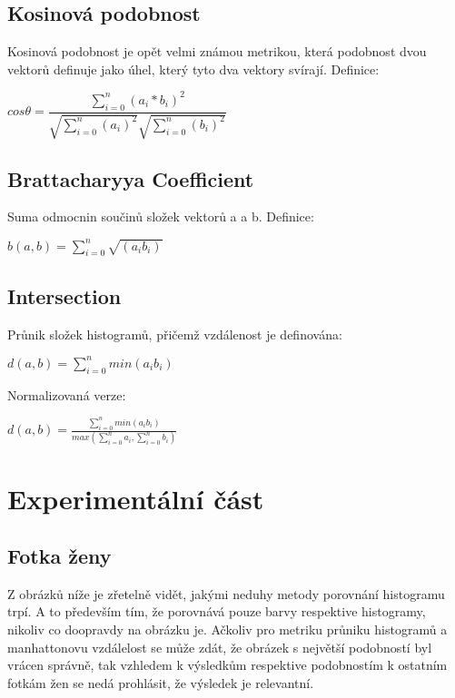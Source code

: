 \documentclass{report}
\begin{document}
	\subsection{Kosinová podobnost}
	Kosinová podobnost je opět velmi známou metrikou, která podobnost dvou vektorů definuje jako úhel, který tyto dva vektory svírají.
	Definice:
	\begin{center}
		$cos\theta = \dfrac{\sum_{i=0}^n (a_i*b_i)^2}{\sqrt{\sum_{i=0}^n (a_i)^2}\sqrt{\sum_{i=0}^n (b_i)^2}}$
	\end{center}
	\subsection{Brattacharyya Coefficient}
	Suma odmocnin součinů složek vektorů a a b.
	Definice: 

	\begin{center}
		$b(a,b) = \sum_{i=0}^{n}{\sqrt{(a_i b_i)}}$
	\end{center}

	\subsection{Intersection}
	Průnik složek histogramů, přičemž vzdálenost je definována:

	\begin{center}
		$d(a,b) = \sum_{i=0}^{n}{min(a_i b_i)}$
	\end{center}

	Normalizovaná verze:
	\begin{center}
		$d(a,b) = \frac{\sum_{i=0}^{n}{min(a_i b_i)}}{max(\sum_{i=0}^{n}{a_i},\sum_{i=0}^{n}{b_i})}$
	\end{center}


\clearpage
\section{Experimentální část}
	\subsection{Fotka ženy}
	Z obrázků níže je zřetelně vidět, jakými neduhy metody porovnání histogramu trpí. A to především tím, že porovnává pouze barvy respektive histogramy, nikoliv co doopravdy na obrázku je. Ačkoliv pro metriku průniku histogramů a manhattonovu vzdálelost se může zdát, že obrázek s největší podobností byl vrácen správně, tak vzhledem k výsledkům respektive podobnostím k ostatním fotkám žen se nedá prohlásit, že výsledek je relevantní.
\end{document}
